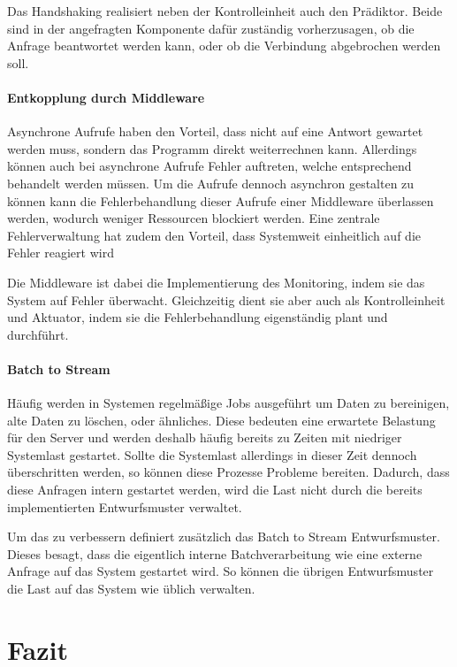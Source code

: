 \documentclass[]{lni}
\begin{document}
Das Handshaking realisiert neben der Kontrolleinheit auch den Prädiktor.
Beide sind in der angefragten Komponente dafür zuständig vorherzusagen, ob die Anfrage beantwortet werden kann, oder ob die Verbindung abgebrochen werden soll.

\paragraph{Entkopplung durch Middleware}
Asynchrone Aufrufe haben den Vorteil, dass nicht auf eine Antwort gewartet werden muss, sondern das Programm direkt weiterrechnen kann. 
Allerdings können auch bei asynchrone Aufrufe Fehler auftreten, welche entsprechend behandelt werden müssen.
Um die Aufrufe dennoch asynchron gestalten zu können kann die Fehlerbehandlung dieser Aufrufe einer Middleware überlassen werden, wodurch weniger Ressourcen blockiert werden.
Eine zentrale Fehlerverwaltung hat zudem den Vorteil, dass Systemweit einheitlich auf die Fehler reagiert wird

Die Middleware ist dabei die Implementierung des Monitoring, indem sie das System auf Fehler überwacht.
Gleichzeitig dient sie aber auch als Kontrolleinheit und Aktuator, indem sie die Fehlerbehandlung eigenständig plant und durchführt.

\paragraph{Batch to Stream}
Häufig werden in Systemen regelmäßige Jobs ausgeführt um Daten zu bereinigen, alte Daten zu löschen, oder ähnliches.
Diese bedeuten eine erwartete Belastung für den Server und werden deshalb häufig bereits zu Zeiten mit niedriger Systemlast gestartet.
Sollte die Systemlast allerdings in dieser Zeit dennoch überschritten werden, so können diese Prozesse Probleme bereiten.
Dadurch, dass diese Anfragen intern gestartet werden, wird die Last nicht durch die bereits implementierten Entwurfsmuster verwaltet.

Um das zu verbessern definiert \cite{PriyankGupta.10Jun2021} zusätzlich das Batch to Stream Entwurfsmuster.
Dieses besagt, dass die eigentlich interne Batchverarbeitung wie eine externe Anfrage auf das System gestartet wird.
So können die übrigen Entwurfsmuster die Last auf das System wie üblich verwalten.


\section*{Fazit}
\end{document}

